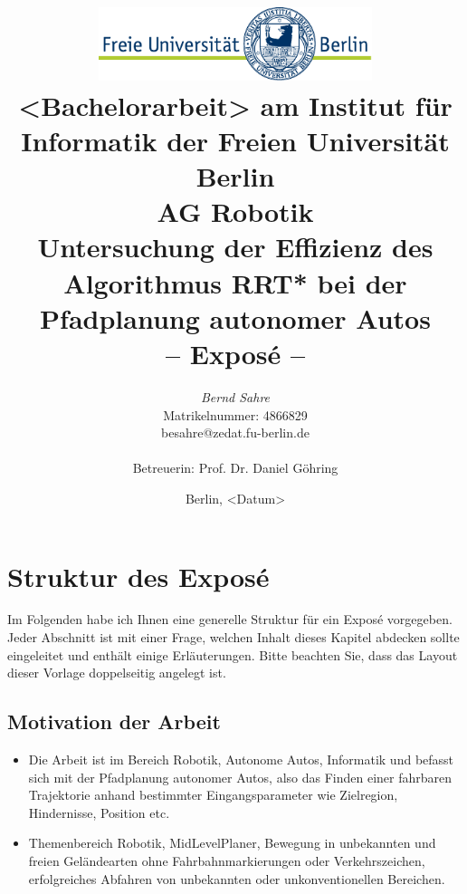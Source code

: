 \documentclass[pdftex,a4paper,12pt]{scrartcl}
\title{\includegraphics[width=0.6\textwidth]{pics/FU_logo.pdf}\\
{\small <Bachelorarbeit> am Institut für Informatik der Freien Universität Berlin}\\
{\small AG Robotik}\\
[6ex]
{\LARGE Untersuchung der Effizienz des Algorithmus RRT* bei der Pfadplanung autonomer Autos}\\
{\normalsize-- Exposé --}}
\author{
{\emph{\normalsize Bernd Sahre}}\\
{\normalsize Matrikelnummer: 4866829}\\
{\normalsize besahre@zedat.fu-berlin.de}\\\\
{\normalsize Betreuerin: Prof. Dr. Daniel Göhring}
}
\date{\normalsize Berlin, <Datum>}
\newcommand{\blankpage}{
\newpage
\thispagestyle{empty}
\mbox{}
\newpage
}
\begin{document}
\maketitle 

\thispagestyle{empty}  %

\blankpage


\setcounter{page}{1} %

\section{Struktur des Exposé}
Im Folgenden habe ich Ihnen eine generelle Struktur für ein Exposé vorgegeben. Jeder Abschnitt ist mit einer Frage, welchen Inhalt dieses Kapitel abdecken sollte eingeleitet und enthält einige Erläuterungen. Bitte beachten Sie, dass das Layout dieser Vorlage doppelseitig angelegt ist.

\subsection{Motivation der Arbeit} 
\begin{itemize}
	\item Die Arbeit ist im Bereich Robotik, Autonome Autos, Informatik und befasst sich mit der Pfadplanung autonomer Autos, also das Finden einer fahrbaren Trajektorie anhand bestimmter Eingangsparameter wie Zielregion, Hindernisse, Position etc.
	
	\item Themenbereich Robotik, MidLevelPlaner, Bewegung in unbekannten und freien Geländearten ohne Fahrbahnmarkierungen oder Verkehrszeichen, erfolgreiches Abfahren von unbekannten oder unkonventionellen Bereichen.
\end{itemize} 
\end{document}
